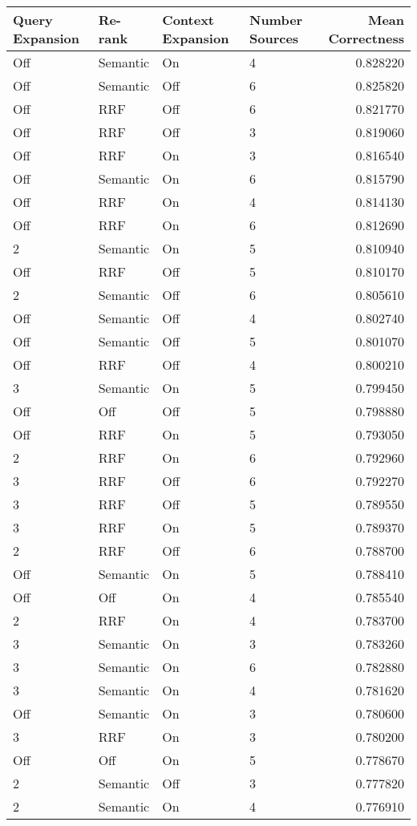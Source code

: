 \begin{tabular}{llllr}
\toprule
Query Expansion & Re-rank & Context Expansion & Number Sources & Mean Correctness \\
\midrule
Off & Semantic & On & 4 & 0.828220 \\
Off & Semantic & Off & 6 & 0.825820 \\
Off & RRF & Off & 6 & 0.821770 \\
Off & RRF & Off & 3 & 0.819060 \\
Off & RRF & On & 3 & 0.816540 \\
Off & Semantic & On & 6 & 0.815790 \\
Off & RRF & On & 4 & 0.814130 \\
Off & RRF & On & 6 & 0.812690 \\
2 & Semantic & On & 5 & 0.810940 \\
Off & RRF & Off & 5 & 0.810170 \\
2 & Semantic & Off & 6 & 0.805610 \\
Off & Semantic & Off & 4 & 0.802740 \\
Off & Semantic & Off & 5 & 0.801070 \\
Off & RRF & Off & 4 & 0.800210 \\
3 & Semantic & On & 5 & 0.799450 \\
Off & Off & Off & 5 & 0.798880 \\
Off & RRF & On & 5 & 0.793050 \\
2 & RRF & On & 6 & 0.792960 \\
3 & RRF & Off & 6 & 0.792270 \\
3 & RRF & Off & 5 & 0.789550 \\
3 & RRF & On & 5 & 0.789370 \\
2 & RRF & Off & 6 & 0.788700 \\
Off & Semantic & On & 5 & 0.788410 \\
Off & Off & On & 4 & 0.785540 \\
2 & RRF & On & 4 & 0.783700 \\
3 & Semantic & On & 3 & 0.783260 \\
3 & Semantic & On & 6 & 0.782880 \\
3 & Semantic & On & 4 & 0.781620 \\
Off & Semantic & On & 3 & 0.780600 \\
3 & RRF & On & 3 & 0.780200 \\
Off & Off & On & 5 & 0.778670 \\
2 & Semantic & Off & 3 & 0.777820 \\
2 & Semantic & On & 4 & 0.776910 \\

\end{tabular}
